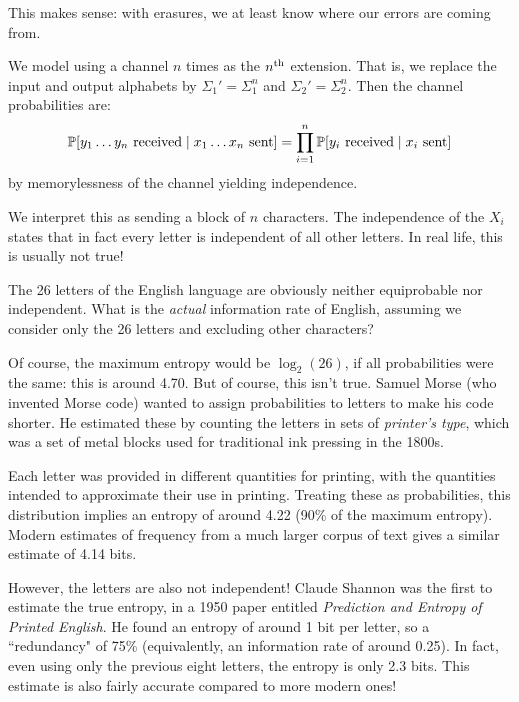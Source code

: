 \documentclass{article}
\begin{document}
\begin{note}
	This makes sense:
	with erasures, we at least know where our errors are coming from.
\end{note}

\begin{definition}
    We model using a channel $n$ times as the $n\th$ extension.
    That is, we replace the input and output alphabets by
    $\Sigma_1' = \Sigma_1^n$ and $\Sigma_2' = \Sigma_2^n$.
    Then the channel probabilities are:
    \[
	\P[y_1 \dots y_n \text{ received} \mid x_1 \dots x_n \text{ sent}] =
	\prod_{i=1}^n  \P[y_i \text{ received} \mid x_i \text{ sent}]
	\]
	by memorylessness of the channel yielding independence.
\end{definition}

\begin{note}
	We interpret this as sending a block of $n$ characters.
	The independence of the $X_i$ states that in fact
	every letter is independent of all other letters.
	In real life, this is usually not true!
\end{note}

\begin{remark}
    The 26 letters of the English language are obviously neither equiprobable nor independent. What is the \textit{actual} information rate of English, assuming we consider only the 26 letters and excluding other characters?

	Of course, the maximum entropy would be $\log_2(26)$, if all probabilities were the same: this is around 4.70. But of course, this isn't true. Samuel Morse (who invented Morse code) wanted to assign probabilities to letters to make his code shorter. He estimated these by counting the letters in sets of \textit{printer's type}, which was a set of metal blocks used for traditional ink pressing in the 1800s.
	
	Each letter was provided in different quantities for printing, with the quantities intended to approximate their use in printing. Treating these as probabilities, this distribution implies an entropy of around 4.22 (90\% of the maximum entropy). Modern estimates of frequency from a much larger corpus of text gives a similar estimate of 4.14 bits.

	However, the letters are also not independent! Claude Shannon was the first to estimate the true entropy, in a 1950 paper entitled \textit{Prediction and Entropy of Printed English}. He found an entropy of around 1 bit per letter, so a ``redundancy" of 75\% (equivalently, an information rate of around 0.25). In fact, even using only the previous eight letters, the entropy is only 2.3 bits. This estimate is also fairly accurate compared to more modern ones!
\end{remark}
\end{document}
